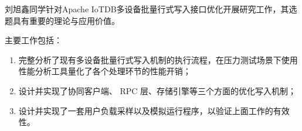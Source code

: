 
\begin{comments}
  刘旭鑫同学针对Apache IoTDB多设备批量行式写入接口优化开展研究工作，其选题具有重要的理论与应用价值。

主要工作包括：
\begin{enumerate}
  \item 完整分析了现有多设备批量行式写入机制的执行流程，在压力测试场景下使用性能分析工具量化了各个处理环节的性能开销；
  \item 设计并实现了协同客户端、 RPC 层、存储引擎等三个方面的优化写入机制；
  \item 设计并实现了一套用户负载采样以及模拟运行程序，以验证上面工作的有效性。
\end{enumerate}

\end{comments}
